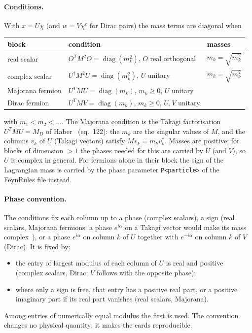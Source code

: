 \documentclass[11pt]{article}
\newcommand{\code}[1]{\texttt{#1}}
\newcommand{\diag}{\operatorname{diag}}
\begin{document}
\paragraph{Conditions.} With $x = U\chi$ (and $w = V\chi^c$ for Dirac pairs) the mass terms
are diagonal when
\begin{center}
\begin{tabular}{lll}
\toprule
block & condition & masses \\ \midrule
real scalar     & $O^T M^2 O = \diag(m_k^2)$, $O$ real orthogonal & $m_k = \sqrt{m_k^2}$ \\
complex scalar  & $U^\dagger M^2 U = \diag(m_k^2)$, $U$ unitary   & $m_k = \sqrt{m_k^2}$ \\
Majorana fermion& $U^T M U = \diag(m_k)$, $m_k\ge0$, $U$ unitary & \\
Dirac fermion   & $U^T M V = \diag(m_k)$, $m_k\ge0$, $U,V$ unitary & \\
\bottomrule
\end{tabular}
\end{center}
with $m_1 < m_2 < \dots$. The Majorana condition is the Takagi factorisation
$U^TMU = M_D$ of Haber~\cite{Haber} (eq.~122): the $m_k$ are the singular values of $M$, and
the columns $v_k$ of $U$ (Takagi vectors) satisfy $M v_k = m_k v_k^*$. Masses are positive;
for blocks of dimension $> 1$ the phases needed for this are carried by $U$ (and $V$), so
$U$ is complex in general. For fermions alone in their block the sign of the Lagrangian mass
is carried by the phase parameter \code{P<particle>} of the FeynRules file instead.

\paragraph{Phase convention.} The conditions fix each column up to
a phase (complex scalars), a sign (real scalars, Majorana fermions: a phase $e^{i\alpha}$ on
a Takagi vector would make its mass complex~\cite{Haber}), or a phase $e^{i\alpha}$ on column
$k$ of $U$ together with $e^{-i\alpha}$ on column $k$ of $V$ (Dirac). It is fixed by:
\begin{itemize}
  \item the entry of largest modulus of each column of $U$ is real and positive (complex
        scalars, Dirac; $V$ follows with the opposite phase);
  \item where only a sign is free, that entry has a positive real part, or a positive
        imaginary part if its real part vanishes (real scalars, Majorana).
\end{itemize}
Among entries of numerically equal modulus the first is used. The convention changes no
physical quantity; it makes the cards reproducible.
\end{document}
